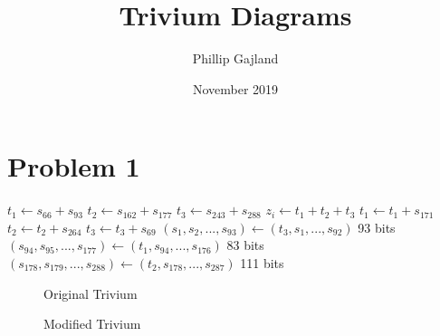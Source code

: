 \documentclass{article}
\title{Trivium Diagrams}
\author{Phillip Gajland}
\date{November 2019}
\begin{document}
    \maketitle

    \section*{Problem 1}


    \begin{center}
        \begin{minipage}{.7\linewidth}
            \begin{algorithm}[H]
                \begin{algorithmic}[1]

                    \State $t_1 \gets s_{66} + s_{93}$
                    \State $t_2 \gets s_{162} + s_{177}$
                    \State $t_3 \gets s_{243} + s_{288}$
                    \State
                    \State $z_i \gets t_1 + t_2 + t_3$
                    \State
                    \State $t_1 \gets t_1 + s_{171}$
                    \State $t_2 \gets t_2 + s_{264}$
                    \State $t_3 \gets t_3 + s_{69}$
                    \State
                    \State $(s_1,s_2,...,s_{93}) \gets (t_3,s_1,...,s_{92})$ 93 bits
                    \State $(s_{94},s_{95},...,s_{177}) \gets (t_1,s_{94},...,s_{176})$ 83 bits
                    \State $(s_{178},s_{179},...,s_{288}) \gets (t_2,s_{178},...,s_{287})$ 111 bits
                    \EndFor
                \end{algorithmic}
            \end{algorithm}
        \end{minipage}
    \end{center}

    \begin{figure}
        
        \caption{Original Trivium}
        \label{fig:original}
    \end{figure}


    \begin{figure}
        
        \caption{Modified Trivium}
        \label{fig:modified}
    \end{figure}





    
    \nocite{*}
\end{document}
